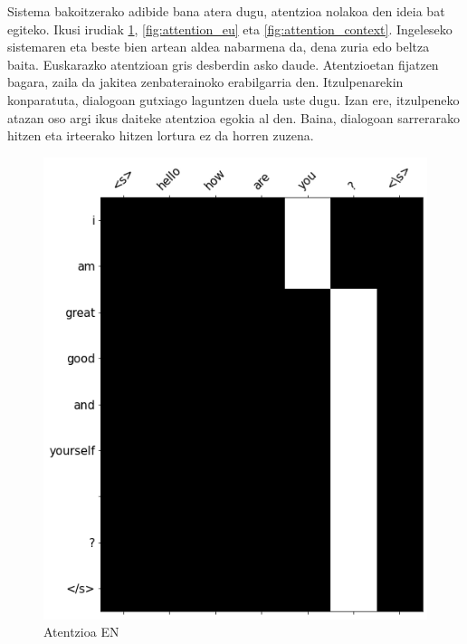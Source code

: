 \documentclass[11pt,a4paper]{article}
\begin{document}
Sistema bakoitzerako adibide bana atera dugu, atentzioa nolakoa den ideia bat egiteko. Ikusi irudiak \ref{fig:attention_en}, \ref{fig:attention_eu} eta \ref{fig:attention_context}. Ingeleseko sistemaren eta beste bien artean aldea nabarmena da, dena zuria edo beltza baita. Euskarazko atentzioan gris desberdin asko daude. Atentzioetan fijatzen bagara, zaila da jakitea zenbaterainoko erabilgarria den. Itzulpenarekin konparatuta, dialogoan gutxiago laguntzen duela uste dugu. Izan ere, itzulpeneko atazan oso argi ikus daiteke atentzioa egokia al den. Baina, dialogoan sarrerarako hitzen eta irteerako hitzen lortura ez da horren zuzena.

\begin{figure}[ht]
    \centering
    \includegraphics[width=\linewidth]{attention_en}
    \caption{Atentzioa EN}
    \label{fig:attention_en}
\end{figure}
\end{document}
